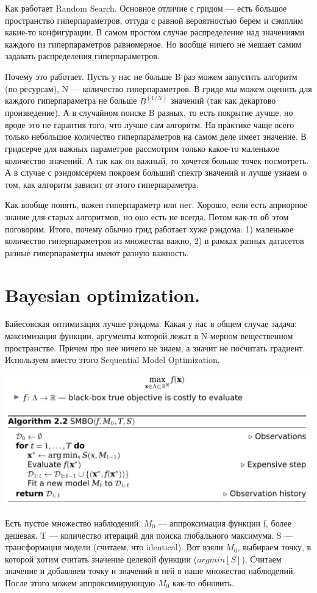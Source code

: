 Как работает Random Search. Основное отличие с гридом --- есть большое пространство гиперпараметров, оттуда с равной вероятностью берем и сэмплим какие-то конфигурации. В самом простом случае распределение над значениями каждого из гиперпараметров равномерное. Но вообще ничего не мешает самим задавать распределения гиперпараметров.
    
Почему это работает. Пусть у нас не больше B раз можем запустить алгоритм (по ресурсам), N --- количество гиперпараметров. В гриде мы можем оценить для каждого гиперпараметра не больше $B^(1/N)$ значений (так как декартово произведение). А в случайном поиске B разных, то есть покрытие лучше, но вроде это не гарантия того, что лучше сам алгоритм. На практике чаще всего только небольшое количество гиперпараметров на самом деле имеет значение. В гридсерче для важных параметров рассмотрим только какое-то маленькое количество значений. А так как он важный, то хочется больше точек посмотреть. А в случае с рэндомсерчем покроем больший спектр значений и лучше узнаем о том, как алгоритм зависит от этого гиперпараметра.

Как вообще понять, важен гиперпараметр или нет. Хорошо, если есть априорное знание для старых алгоритмов, но оно есть не всегда. Потом как-то об этом поговорим. Итого, почему обычно грид работает хуже рэндома: 1) маленькое количество гиперпараметров из множества важно, 2) в рамках разных датасетов разные гиперпараметры имеют разную важность.

\section{Bayesian optimization.}
Байесовская оптимизация лучше рэндома. Какая у нас в общем случае задача: максимизация функции, аргументы которой лежат в N-мерном вещественном пространстве. Причем про нее ничего не знаем, а значит не посчитать градиент. Используем вместо этого Sequential Model Optimization.
\begin{center}
    \includegraphics[scale=0.4]{figures/lecture7_seq_opt.png}
\end{center}
Есть пустое множество наблюдений. $M_0$ --- аппроксимация функции f, более дешевая. T --- количество итераций для поиска глобального максимума. S --- трансформация модели (считаем, что identical). Вот взяли $M_0$, выбираем точку, в которой хотим считать значение целевой функции ($argmin[S]$). Считаем значение и добавляем точку и значений в ней в наше множество наблюдений. После этого можем аппроксимирующую $M_0$ как-то обновить.
    
